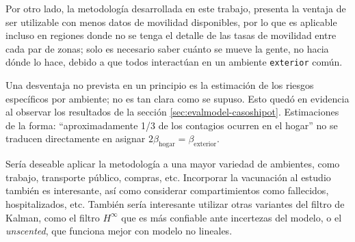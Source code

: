 Por otro lado, la metodología desarrollada en este trabajo, presenta la ventaja de ser utilizable con menos datos de movilidad disponibles, por lo que es aplicable incluso en regiones donde no se tenga el detalle de las tasas de movilidad entre cada par de zonas; solo es necesario saber cuánto se mueve la gente, no hacia dónde lo hace, debido a que todos interactúan en un ambiente \texttt{exterior} común.

Una desventaja no prevista en un principio es la estimación de los riesgos específicos por ambiente; no es tan clara como se supuso. Esto quedó en evidencia al observar los resultados de la sección \ref{sec:evalmodel-casoshipot}. Estimaciones de la forma: ``aproximadamente 1/3 de los contagios ocurren en el hogar'' \cite{Ferguson2020} no se traducen directamente en asignar \( 2 \beta_{\text{hogar}} = \beta_{\text{exterior}}\).

Sería deseable aplicar la metodología a una mayor variedad de ambientes, como trabajo, transporte público, compras, etc. Incorporar la vacunación al estudio también es interesante, así como considerar compartimientos como fallecidos, hospitalizados, etc. También sería interesante utilizar otras variantes del filtro de Kalman, como el filtro \(H^{\infty}\) que es más confiable ante incertezas del modelo, o el \textit{unscented}, que funciona mejor con modelo no lineales.
